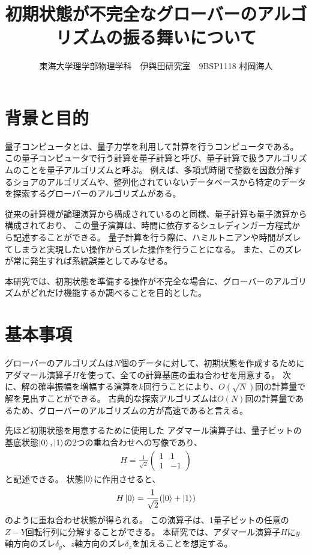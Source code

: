 \documentclass[platex,dvipdfmx, twocolumn]{jsarticle}			%
\title{初期状態が不完全なグローバーのアルゴリズムの振る舞いについて}
\author{東海大学理学部物理学科　伊與田研究室　9BSP1118 村岡海人}
\date{}
\begin{document}
\maketitle
\section{背景と目的}
量子コンピュータとは、量子力学を利用して計算を行うコンピュータである。
この量子コンピュータで行う計算を量子計算と呼び、量子計算で扱うアルゴリズムのことを量子アルゴリズムと呼ぶ。
例えば、多項式時間で整数を因数分解するショアのアルゴリズムや、整列化されていないデータベースから特定のデータを探索するグローバーのアルゴリズムがある。

従来の計算機が論理演算から構成されているのと同様、量子計算も量子演算から構成されており、
この量子演算は、時間に依存するシュレディンガー方程式から記述することができる。
量子計算を行う際に、ハミルトニアンや時間がズレてしまうと実現したい操作からズレた操作を行うことになる。
また、このズレが常に発生すれば系統誤差としてみなせる。

本研究では、初期状態を準備する操作が不完全な場合に、グローバーのアルゴリズムがどれだけ機能するか調べることを目的とした。

\section{基本事項}
グローバーのアルゴリズムは$N個$のデータに対して、初期状態を作成するためにアダマール演算子$H$を使って、全ての計算基底の重ね合わせを用意する。
次に、解の確率振幅を増幅する演算を$k$回行うことにより、$O(\sqrt{N})$回の計算量で解を見出すことができる。
古典的な探索アルゴリズムは$O(N)$回の計算量であるため、グローバーのアルゴリズムの方が高速であると言える\cite{QuantumDojo}。

先ほど初期状態を用意するために使用した
アダマール演算子は、量子ビットの基底状態$\ket{0},\ket{1}$の2つの重ね合わせへの写像であり、
\begin{eqnarray*}
    H = \frac{1}{\sqrt{2}}\begin{pmatrix}
        1 & 1\\
        1 & -1
    \end{pmatrix}
\end{eqnarray*}
と記述できる。
状態$\ket{0}$に作用させると、
\begin{eqnarray*}
    H\ket{0} = \frac{1}{\sqrt{2}}(\ket{0} + \ket{1})
\end{eqnarray*}
のように重ね合わせ状態が得られる\cite{BasicQuantumComputer}。
この演算子は、1量子ビットの任意の$Z-Y$回転行列に分解することができる。
本研究では、アダマール演算子$H$に$y$軸方向のズレ$\delta_y$、$z$軸方向のズレ$\delta_z$を加えることを想定する\cite{QuantumComputingFundamentalsAndPhysicsContacts}。
\end{document}
